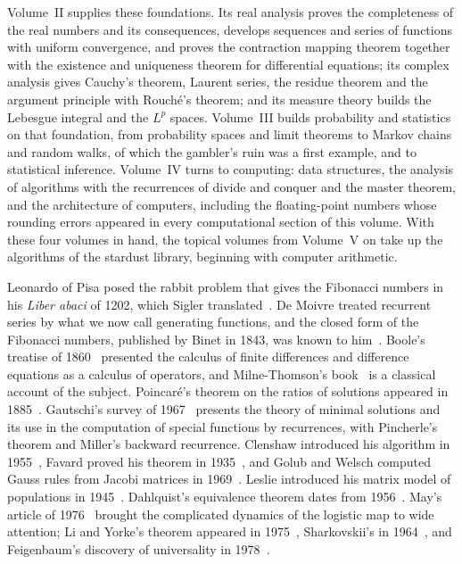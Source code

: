 Volume~II supplies these foundations. Its real analysis proves the completeness of the real numbers and its consequences, develops sequences and series of functions with uniform convergence, and proves the contraction mapping theorem together with the existence and uniqueness theorem for differential equations; its complex analysis gives Cauchy's theorem, Laurent series, the residue theorem and the argument principle with Rouch\'e's theorem; and its measure theory builds the Lebesgue integral and the $L^p$ spaces. Volume~III builds probability and statistics on that foundation, from probability spaces and limit theorems to Markov chains and random walks, of which the gambler's ruin was a first example, and to statistical inference. Volume~IV turns to computing: data structures, the analysis of algorithms with the recurrences of divide and conquer and the master theorem, and the architecture of computers, including the floating-point numbers whose rounding errors appeared in every computational section of this volume. With these four volumes in hand, the topical volumes from Volume~V on take up the algorithms of the stardust library, beginning with computer arithmetic.

\chapternotes

Leonardo of Pisa posed the rabbit problem that gives the Fibonacci numbers in his \emph{Liber abaci} of 1202, which Sigler translated~\cite{sigler2002}. De Moivre treated recurrent series by what we now call generating functions, and the closed form of the Fibonacci numbers, published by Binet in 1843, was known to him~\cite[Sect.~1.2.8]{knuth1997taocp1}. Boole's treatise of 1860~\cite{boole1860} presented the calculus of finite differences and difference equations as a calculus of operators, and Milne-Thomson's book~\cite{milnethomson1933} is a classical account of the subject. Poincar\'e's theorem on the ratios of solutions appeared in 1885~\cite{poincare1885}. Gautschi's survey of 1967~\cite{gautschi1967} presents the theory of minimal solutions and its use in the computation of special functions by recurrences, with Pincherle's theorem and Miller's backward recurrence. Clenshaw introduced his algorithm in 1955~\cite{clenshaw1955}, Favard proved his theorem in 1935~\cite{favard1935}, and Golub and Welsch computed Gauss rules from Jacobi matrices in 1969~\cite{golubwelsch1969}. Leslie introduced his matrix model of populations in 1945~\cite{leslie1945}. Dahlquist's equivalence theorem dates from 1956~\cite{dahlquist1956}. May's article of 1976~\cite{may1976} brought the complicated dynamics of the logistic map to wide attention; Li and Yorke's theorem appeared in 1975~\cite{li1975}, Sharkovskii's in 1964~\cite{sharkovskii1964}, and Feigenbaum's discovery of universality in 1978~\cite{feigenbaum1978}.

